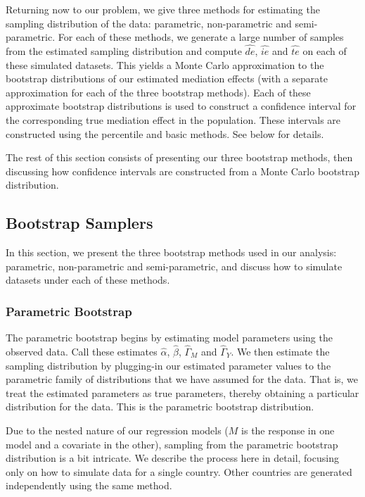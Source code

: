 \documentclass{article}
\begin{document}
Returning now to our problem, we give three methods for estimating the sampling distribution of the data: parametric, non-parametric and semi-parametric. For each of these methods, we generate a large number of samples from the estimated sampling distribution and compute $\hat{de}$, $\hat{ie}$ and $\hat{te}$ on each of these simulated datasets. This yields a Monte Carlo approximation to the bootstrap distributions of our estimated mediation effects (with a separate approximation for each of the three bootstrap methods). Each of these approximate bootstrap distributions is used to construct a confidence interval for the corresponding true mediation effect in the population. These intervals are constructed using the percentile and basic methods. See below for details.

The rest of this section consists of presenting our three bootstrap methods, then discussing how confidence intervals are constructed from a Monte Carlo bootstrap distribution.



\subsection{Bootstrap Samplers}

In this section, we present the three bootstrap methods used in our analysis: parametric, non-parametric and semi-parametric, and discuss how to simulate datasets under each of these methods.

\subsubsection{Parametric Bootstrap}
\label{sec:par_boot}

The parametric bootstrap begins by estimating model parameters using the observed data. Call these estimates $\hat{\alpha}$, $\hat{\beta}$, $\hat{\Gamma}_M$ and $\hat{\Gamma}_Y$. We then estimate the sampling distribution by plugging-in our estimated parameter values to the parametric family of distributions that we have assumed for the data. That is, we treat the estimated parameters as true parameters, thereby obtaining a particular distribution for the data. This is the parametric bootstrap distribution.

Due to the nested nature of our regression models ($M$ is the response in one model and a covariate in the other), sampling from the parametric bootstrap distribution is a bit intricate. We describe the process here in detail, focusing only on how to simulate data for a single country. Other countries are generated independently using the same method. 
\end{document}
